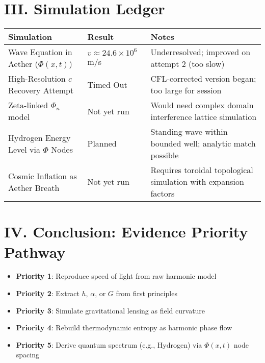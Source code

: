 \documentclass[12pt]{article}
\begin{document}
\vspace{1cm}

\section*{III. Simulation Ledger}

\begin{longtable}{@{}p{5cm}p{4cm}p{6cm}@{}}
\toprule
\textbf{Simulation} & \textbf{Result} & \textbf{Notes} \\
\midrule
Wave Equation in Aether ($\Phi(x,t)$) & $v \approx 24.6 \times 10^6$ m/s & Underresolved; improved on attempt 2 (too slow) \\
High-Resolution $c$ Recovery Attempt & Timed Out & CFL-corrected version began; too large for session \\
Zeta-linked $\Phi_n$ model & Not yet run & Would need complex domain interference lattice simulation \\
Hydrogen Energy Level via $\Phi$ Nodes & Planned & Standing wave within bounded well; analytic match possible \\
Cosmic Inflation as Aether Breath & Not yet run & Requires toroidal topological simulation with expansion factors \\
\bottomrule
\end{longtable}

\vspace{1cm}

\section*{IV. Conclusion: Evidence Priority Pathway}

\begin{itemize}
  \item \textbf{Priority 1}: Reproduce speed of light from raw harmonic model
  \item \textbf{Priority 2}: Extract $h$, $\alpha$, or $G$ from first principles
  \item \textbf{Priority 3}: Simulate gravitational lensing as field curvature
  \item \textbf{Priority 4}: Rebuild thermodynamic entropy as harmonic phase flow
  \item \textbf{Priority 5}: Derive quantum spectrum (e.g., Hydrogen) via $\Phi(x,t)$ node spacing
\end{itemize}
\end{document}
